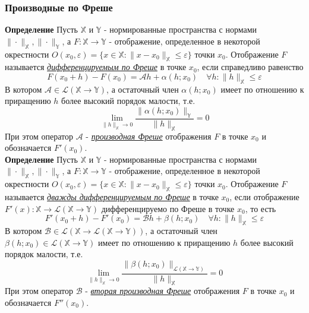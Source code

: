\documentclass[A4]{article}
\begin{document}
\subsubsection{Производные по Фреше}
\textbf{Определение} Пусть $\mathbb{X}$ и $\mathbb{Y}$ - нормированные пространства с нормами $\|\cdot\|_{\mathbb{X}},\|\cdot\|_{\mathbb{Y}}$, а $F: \mathbb{X}\rightarrow\mathbb{Y}$ - отображение, определенное в некоторой окрестности $O(x_0,\varepsilon) =\{x\in\mathbb{X}:\|x-x_0\|_{\mathbb{X}}\leqslant\varepsilon\}$ точки $x_0$. Отображение $F$ называется \underline{\emph{дифференцируемым по Фреше}} в точке $x_0$, если справедливо равенство
\begin{equation*}
F(x_0+h)-F(x_0)=\mathcal{A}h+\alpha(h;x_0)\quad\forall h:\|h\|_{\mathbb{X}}\leqslant\varepsilon
\end{equation*}
В котором $\mathcal{A}\in\mathcal{L}(\mathbb{X}\rightarrow\mathbb{Y})$, а остаточный член $\alpha(h;x_0)$ имеет по отношению к приращению $h$ более высокий порядок малости, т.е.
\begin{equation*}
\lim_{\|h\|_{\mathbb{X}}\rightarrow 0} \frac{\|\alpha(h;x_0)\|_{\mathbb{Y}}}{\|h\|_{\mathbb{X}}}=0
\end{equation*}
При этом оператор $\mathcal{A}$ - \underline{\emph{производная Фреше}} отображения $F$ в точке $x_0$ и обозначается $F'(x_0)$.\\
\textbf{Определение} Пусть $\mathbb{X}$ и $\mathbb{Y}$ - нормированные пространства с нормами $\|\cdot\|_{\mathbb{X}},\|\cdot\|_{\mathbb{Y}}$, а $F: \mathbb{X}\rightarrow\mathbb{Y}$ - отображение, определенное в некоторой окрестности $O(x_0,\varepsilon) =\{x\in\mathbb{X}:\|x-x_0\|_{\mathbb{X}}\leqslant\varepsilon\}$ точки $x_0$. Отображение $F$ называется \underline{\emph{дважды дифференцируемым по Фреше}} в точке $x_0$, если отображение $F'(x):\mathbb{X}\rightarrow\mathcal{L}(\mathbb{X}\rightarrow\mathbb{Y})$ дифференцируемо по Фреше в точке $x_0$, то есть 
\begin{equation*}
F'(x_0+h)-F'(x_0)=\mathcal{B}h+\beta(h;x_0)\quad\forall h:\|h\|_{\mathbb{X}}\leqslant\varepsilon
\end{equation*}
В котором $\mathcal{B}\in\mathcal{L}(\mathbb{X}\rightarrow\mathcal{L}(\mathbb{X}\rightarrow\mathbb{Y}))$, а остаточный член $\beta(h;x_0)\in\mathcal{L}(\mathbb{X}\rightarrow\mathbb{Y})$ имеет по отношению к приращению $h$ более высокий порядок малости, т.е.
\begin{equation*}
\lim_{\|h\|_{\mathbb{X}}\rightarrow 0} \frac{\|\beta(h;x_0)\|_{\mathcal{L}(\mathbb{X}\rightarrow\mathbb{Y})}}{\|h\|_{\mathbb{X}}}=0
\end{equation*}
При этом оператор $\mathcal{B}$ - \underline{\emph{вторая производная Фреше}} отображения $F$ в точке $x_0$ и обозначается $F''(x_0)$.\\
\end{document}
